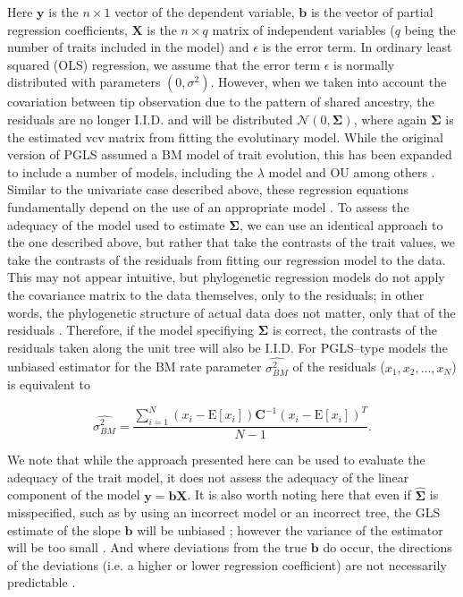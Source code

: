 \documentclass[12pt]{article}
\begin{document}
Here $\mathbf{y}$ is the $n \times 1$ vector of the dependent variable, $\mathbf{b}$ is the vector of partial regression coefficients, $\mathbf{X}$ is the $n \times q$ matrix of independent variables ($q$ being the number of traits included in the model) and $\epsilon$ is the error term. In ordinary least squared (OLS) regression, we assume that the error term $\epsilon$ is normally distributed with parameters $(0, \sigma^2)$. However, when we taken into account the covariation between tip observation due to the pattern of shared ancestry, the residuals are no longer I.I.D. and will be distributed $\mathcal{N} (0, \mathbf{\Sigma})$, where again $\mathbf{\Sigma}$ is the estimated vcv matrix from fitting the evolutinary model. While the original version of PGLS assumed a BM model of trait evolution, this has been expanded to include a number of models, including the $\lambda$ model \citep{Pagel1997, Freckleton2009, Revell2010} and OU \citep{Hansen2008, Labra2009, Bartoszek2012} among others \citep[see also][]{Lynch1991, Hadfield2010}. Similar to the univariate case described above, these regression equations fundamentally depend on the use of an appropriate model \citep{Hansen2012SysBio}. To assess the adequacy of the model used to estimate $\mathbf{\Sigma}$, we can use an identical approach to the one described above, but rather that take the contrasts of the trait values, we take the contrasts of the residuals from fitting our regression model to the data. This may not appear intuitive, but phylogenetic regression models do not apply the covariance matrix to the data themselves, only to the residuals; in other words, the phylogenetic structure of actual data does not matter, only that of the residuals \citep{Rohlf2001}. Therefore, if the model specifiying $\mathbf{\Sigma}$ is correct, the contrasts of the residuals taken along the unit tree will also be I.I.D. For PGLS--type models the unbiased estimator for the  BM rate parameter $\hat{\sigma^2_{BM}}$ of the residuals ($x_1, x_2, \ldots , x_N$) is equivalent to

\begin{equation}
\hat{\sigma^2_{BM}} = \frac{\sum^N_{i=1} (x_i - \mathrm{E}[x_i])\mathbf{C}^{-1}(x_i - \mathrm{E}[x_i])^{T}}{N-1} .
\end{equation}

We note that while the approach presented here can be used to evaluate the adequacy of the trait model, it does not assess the adequacy of the linear component of the model $\mathbf{y} = \mathbf{b}\mathbf{X}$. It is also worth noting here that even if $\hat{\mathbf{\Sigma}}$ is misspecified, such as by using an incorrect model or an incorrect tree, the GLS estimate of the slope $\mathbf{b}$ will be unbiased \citep{Rao1999}; however the variance of the estimator will be too small \citep{Rohlf2006}. And where deviations from the true $\mathbf{b}$ do occur, the directions of the deviations (i.e. a higher or lower regression coefficient) are not necessarily predictable \citep{Rohlf2006}.
\end{document}
